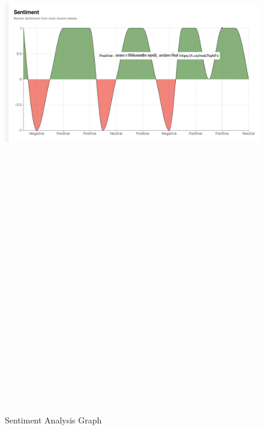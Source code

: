 \documentclass[a4paper,12pt]{article}
\begin{document}
{{{  
 \begin{figure}[htbp]
			\centering
			\includegraphics[width=6in, height=15in, keepaspectratio]{sentiment.png}
			\label{sent}
			\caption{Sentiment Analysis Graph}
		\end{figure}
  \clearpage


















}}}
\end{document}
